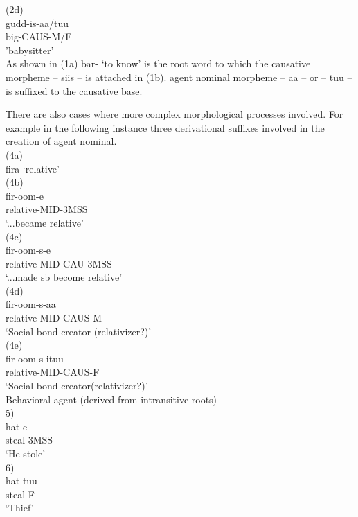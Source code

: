 \documentclass[11pt,a4paper]{article}
\begin{document}
(2d)\\
\indent gudd-is-aa/tuu\\
\indent big-CAUS-M/F\\
\indent 'babysitter'\\

As shown in (1a) bar- ‘to know’ is the root word to which the causative morpheme – siis – is attached in (1b). agent nominal morpheme – aa – or – tuu – is suffixed to the causative base. 

There are also cases where more complex morphological processes involved. For example in the following instance three derivational suffixes involved in the creation of agent nominal.\\

(4a) 	\\
\indent fira ‘relative’\\

(4b) 	\\
\indent fir-oom-e\\
\indent relative-MID-3MSS\\
\indent ‘...became relative’\\

(4c)	\\
\indent fir-oom-s-e\\
\indent relative-MID-CAU-3MSS\\
\indent ‘...made sb become relative’\\

(4d)	\\
\indent fir-oom-s-aa\\
\indent relative-MID-CAUS-M\\
\indent ‘Social bond creator (relativizer?)’\\

(4e)\\
\indent	fir-oom-s-ituu\\
\indent relative-MID-CAUS-F\\
\indent ‘Social bond creator(relativizer?)’\\

Behavioral agent (derived from intransitive roots)\\

5) 	\\
\indent hat-e\\
\indent steal-3MSS\\
\indent ‘He stole’\\
6) 	\\
\indent hat-tuu\\
\indent steal-F\\
\indent ‘Thief’\\
\end{document}
